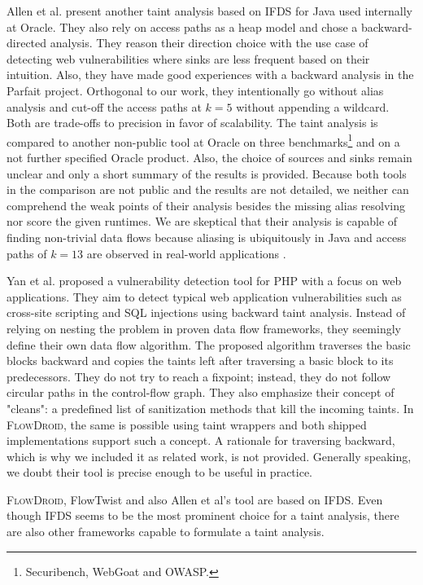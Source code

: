 \documentclass[../draft.tex]{subfiles}
\begin{document}
    Allen et al.\cite{Allen2021} present another taint analysis based on IFDS for Java used internally at Oracle.
    They also rely on access paths as a heap model and chose a backward-directed analysis.
    They reason their direction choice with the use case of detecting web vulnerabilities where sinks are less frequent based on their intuition.
    Also, they have made good experiences with a backward analysis in the Parfait\cite{Winter2013} project.
    Orthogonal to our work, they intentionally go without alias analysis and cut-off the access paths at $k=5$ without appending a wildcard.
    Both are trade-offs to precision in favor of scalability.
    The taint analysis is compared to another non-public tool at Oracle on three benchmarks\footnote{Securibench, WebGoat and OWASP.} and on a not further specified Oracle product.
    Also, the choice of sources and sinks remain unclear and only a short summary of the results is provided.
    Because both tools in the comparison are not public and the results are not detailed, we neither can comprehend the weak points of their analysis besides the missing alias resolving nor score the given runtimes.
    We are skeptical that their analysis is capable of finding non-trivial data flows because aliasing is ubiquitously in Java and access paths of $k=13$ are observed in real-world applications \cite{Spaeth2019}.

    Yan et al.\cite{Yan2017} proposed a vulnerability detection tool for PHP with a focus on web applications.
    They aim to detect typical web application vulnerabilities such as cross-site scripting and SQL injections using backward taint analysis.
    Instead of relying on nesting the problem in proven data flow frameworks, they seemingly define their own data flow algorithm.
    The proposed algorithm traverses the basic blocks backward and copies the taints left after traversing a basic block to its predecessors.
    They do not try to reach a fixpoint; instead, they do not follow circular paths in the control-flow graph.
    They also emphasize their concept of "cleans": a predefined list of sanitization methods that kill the incoming taints.
    In \textsc{FlowDroid}, the same is possible using taint wrappers and both shipped implementations support such a concept.
    A rationale for traversing backward, which is why we included it as related work, is not provided.
    Generally speaking, we doubt their tool is precise enough to be useful in practice.

    \textsc{FlowDroid}, FlowTwist and also Allen et al's tool are based on IFDS.
    Even though IFDS seems to be the most prominent choice for a taint analysis, there are also other frameworks capable to formulate a taint analysis.
\end{document}
